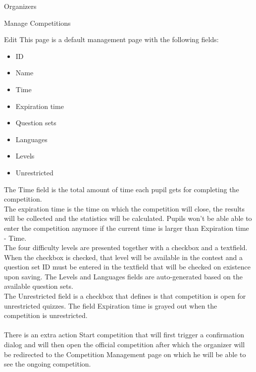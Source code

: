 \begin{section}{Organizers}
\begin{subsection}{Manage Competitions}
		\begin{subsubsection}{Edit}
			This page is a default management page with the following fields:
			\begin{itemize}
				\item ID
				\item Name
				\item Time
				\item Expiration time
				\item Question sets
				\item Languages
				\item Levels
				\item Unrestricted
			\end{itemize}
			The Time field is the total amount of time each pupil gets for completing
			the competition.\\
			The expiration time is the time on which the competition will close,
			the results will be collected and the statistics will be calculated.
			Pupils won't be able able to enter the competition anymore if the
			current time is larger than Expiration time - Time.\\
			The four difficulty levels are presented together with a checkbox and a
			textfield. When the checkbox is checked, that level will be available in the
			contest and a question set ID must be entered in the textfield that will be
			checked on existence upon saving.
			The Levels and Languages fields are auto-generated based on the
			available question sets. \\
			The Unrestricted field is a checkbox that defines is that competition is open
			for unrestricted quizzes. The field Expiration time is grayed out when the
			competition is unrestricted.\\
			\\
			There is an extra action Start competition that will first trigger a
			confirmation dialog and will then open the official competition after which
			the organizer will be redirected to the Competition Management page on which
			he will be able to see the ongoing competition.
		\end{subsubsection}
	\end{subsection}
	

\end{section}
